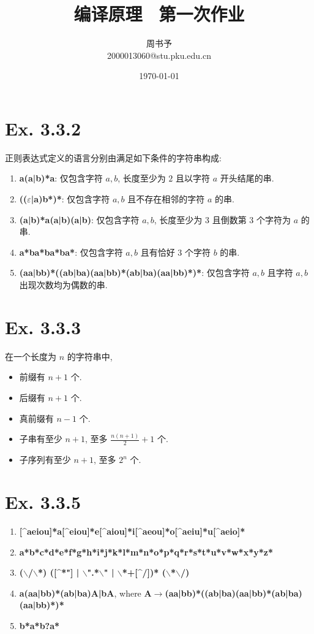 \documentclass[8pt]{article}
\title{\heiti\zihao{1} 编译原理 \ 第一次作业}
\author{\kaishu\zihao{-3} 周书予\\2000013060@stu.pku.edu.cn}
\date{\today}
\theoremstyle{compact}
\begin{document}
\large
{}
\pagestyle{plain}



\maketitle

\section*{Ex. 3.3.2}
正则表达式定义的语言分别由满足如下条件的字符串构成:
\begin{enumerate}
	\item \textbf{a(a|b)*a}: 仅包含字符 $a, b$, 长度至少为 $2$ 且以字符 $a$ 开头结尾的串.
	\item \textbf{(($\varepsilon$|a)b*)*}: 仅包含字符 $a, b$ 且不存在相邻的字符 $a$ 的串.
	\item \textbf{(a|b)*a(a|b)(a|b)}: 仅包含字符 $a, b$, 长度至少为 $3$ 且倒数第 $3$ 个字符为 $a$ 的串.
	\item \textbf{a*ba*ba*ba*}: 仅包含字符 $a, b$ 且有恰好 $3$ 个字符 $b$ 的串.
	\item \textbf{(aa|bb)*((ab|ba)(aa|bb)*(ab|ba)(aa|bb)*)*}: 仅包含字符 $a, b$ 且字符 $a, b$ 出现次数均为偶数的串.
\end{enumerate}

\section*{Ex. 3.3.3}
在一个长度为 $n$ 的字符串中, 
\begin{itemize}
	\item 前缀有 $n + 1$ 个.
	\item 后缀有 $n + 1$ 个.
	\item 真前缀有 $n - 1$ 个.
	\item 子串有至少 $n + 1$, 至多 $\frac{n(n+1)}{2} + 1$ 个.
	\item 子序列有至少 $n + 1$, 至多 $2^n$ 个.
\end{itemize}

\section*{Ex. 3.3.5}
\begin{enumerate}
	\item \textbf{[\^{}aeiou]*a[\^{}eiou]*e[\^{}aiou]*i[\^{}aeou]*o[\^{}aeiu]*u[\^{}aeio]*}
	\item \textbf{a*b*c*d*e*f*g*h*i*j*k*l*m*n*o*p*q*r*s*t*u*v*w*x*y*z*}
	\item \textbf{($\backslash$/$\backslash$*) ([\^{}*"] | $\backslash$".*$\backslash$" | $\backslash$*+[\^{}/])* ($\backslash$*$\backslash$/)}
	\item \textbf{a(aa|bb)*(ab|ba)A|bA}, where \textbf{A$\to$(aa|bb)*((ab|ba)(aa|bb)*(ab|ba)(aa|bb)*)*}
	\item \textbf{b*a*b?a*}
\end{enumerate}
\end{document}
